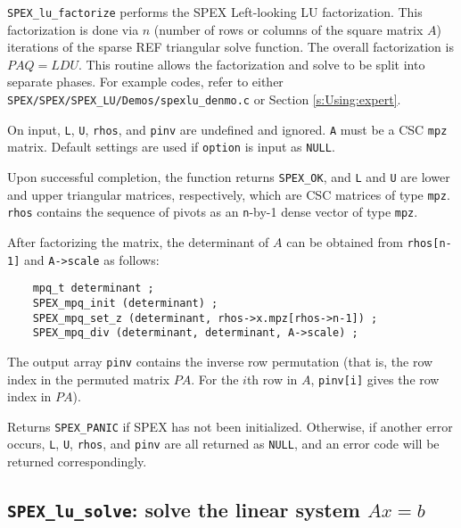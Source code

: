 \documentclass[12pt]{report}
\theoremstyle{definition}
\begin{document}
\verb|SPEX_lu_factorize| performs the SPEX Left-looking LU factorization.
This factorization is done via $n$ (number of rows or columns of the square
matrix $A$) iterations of the sparse REF triangular solve function. The overall
factorization is $PAQ = LDU$.  This routine allows the factorization and solve
to be split into separate phases.  For example codes, refer to either
\verb|SPEX/SPEX/SPEX_LU/Demos/spexlu_denmo.c| or Section \ref{s:Using:expert}.

On input, \verb|L|, \verb|U|, \verb|rhos|, and \verb|pinv| are undefined and
ignored.  \verb|A| must be a CSC \verb|mpz| matrix. Default settings are used
if \verb|option| is input as \verb|NULL|.

Upon successful completion, the function returns \verb|SPEX_OK|, and \verb|L|
and \verb|U| are lower and upper triangular matrices, respectively, which are
CSC matrices of type \verb|mpz|.  \verb|rhos| contains the sequence of pivots
as an \verb|n|-by-1 dense vector of type \verb|mpz|.

After factorizing the matrix, the determinant of $A$ can be obtained from
\verb|rhos[n-1]| and \verb|A->scale| as follows:

\begin{verbatim}
    mpq_t determinant ;
    SPEX_mpq_init (determinant) ;
    SPEX_mpq_set_z (determinant, rhos->x.mpz[rhos->n-1]) ;
    SPEX_mpq_div (determinant, determinant, A->scale) ;
\end{verbatim}

The output array \verb|pinv| contains the inverse row permutation (that is, the
row index in the permuted matrix $PA$. For the $i$th row in $A$, \verb|pinv[i]|
gives the row index in $PA$).

Returns \verb|SPEX_PANIC| if SPEX has not been initialized.  Otherwise, if
another error occurs, \verb|L|, \verb|U|, \verb|rhos|, and \verb|pinv| are all
returned as \verb|NULL|, and an error code will be returned correspondingly.

\cprotect\subsection{\verb|SPEX_lu_solve|: solve the linear system $Ax=b$}
\label{ss:SPEX_lu_solve}
\end{document}
